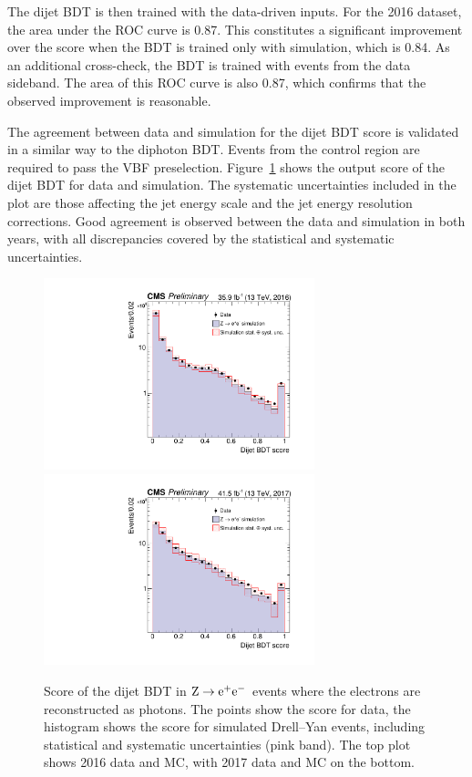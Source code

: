 The dijet BDT is then trained with the data-driven inputs.
For the 2016 dataset, the area under the ROC curve is 0.87.
This constitutes a significant improvement over the score when the BDT is trained only with simulation, 
which is 0.84.
As an additional cross-check, the BDT is trained with events from the data sideband. 
The area of this ROC curve is also 0.87, 
which confirms that the observed improvement is reasonable.

The agreement between data and simulation for the dijet BDT score is validated 
in a similar way to the diphoton BDT.
Events from the \Zee control region are required to pass the VBF preselection.
Figure~\ref{fig:cat_dijetBDT} shows the output score of the dijet BDT for data and simulation.
The systematic uncertainties included in the plot are those affecting the 
jet energy scale and the jet energy resolution corrections.
Good agreement is observed between the data and simulation in both years, 
with all discrepancies covered by the statistical and systematic uncertainties.

\begin{figure}[hptb]
\centering
\includegraphics[width=0.7\textwidth]{Figures/Categorisation/DijetBDT_2016.pdf}
\includegraphics[width=0.7\textwidth]{Figures/Categorisation/DijetBDT_2017.pdf}
\caption{
  Score of the dijet BDT in $\mathrm{Z}\rightarrow{\mathrm{e}^{+}\mathrm{e}^{-}}$
  events where the electrons are reconstructed as photons.
  The points show the score for data, the histogram shows
  the score for simulated Drell--Yan events, including statistical and 
  systematic uncertainties (pink band).
  The top plot shows 2016 data and MC,
  with 2017 data and MC on the bottom.
}
\label{fig:cat_dijetBDT}
\end{figure}

